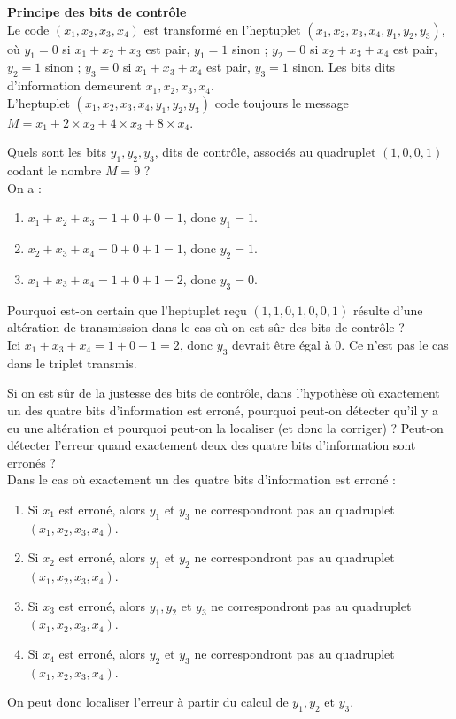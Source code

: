 \documentclass[a4paper,10pt,exos]{nsi}
\begin{document}
    \question \textbf{\textcolor{UGLiBlue}{Principe des bits de contrôle}}\\
    \textcolor{UGLiBlue}{Le code $(x_1, x_2, x_3, x_4)$ est transformé en l’heptuplet $(x_1, x_2, x_3, x_4, y_1, y_2, y_3)$, où $y_1 = 0$ si $x_1 + x_2 + x_3$ est pair, $y_1 = 1$ sinon ; $y_2 = 0$ si $x_2 + x_3 + x_4$ est pair, $y_2 = 1$ sinon ; $y_3 = 0$ si $x_1 + x_3 + x_4$ est pair, $y_3 = 1$ sinon. Les bits dits d’information demeurent $x_1, x_2, x_3, x_4$.\\
    L’heptuplet $(x_1, x_2, x_3, x_4, y_1, y_2, y_3)$ code toujours le message $M = x_1 + 2 \times x_2 + 4 \times x_3 + 8 \times x_4$.}

    \begin{enumalph}
        \item \textcolor{UGLiBlue}{Quels sont les bits $y_1, y_2, y_3$, dits de contrôle, associés au quadruplet $(1,0,0,1)$ codant le nombre $M = 9$ ?}\\
        On a : 
        \begin{enumerate}[label=\textbullet]
            \item $x_1+x_2+x_3=1+0+0=1$, donc $y_1=1$.
            \item $x_2+x_3+x_4=0+0+1=1$, donc $y_2=1$.
            \item $x_1+x_3+x_4=1+0+1=2$, donc $y_3=0$.
        \end{enumerate}
        \item \textcolor{UGLiBlue}{Pourquoi est-on certain que l’heptuplet reçu $(1,1,0,1,0,0,1)$ résulte d’une altération de transmission dans le cas où on est sûr des bits de contrôle ?}\\
        Ici $x_1+x_3+x_4=1+0+1=2$, donc $y_3$ devrait être égal à $0$. Ce n'est pas le cas dans le triplet transmis.
        \item \textcolor{UGLiBlue}{Si on est sûr de la justesse des bits de contrôle, dans l’hypothèse où exactement un des quatre bits d’information est erroné, pourquoi peut-on détecter qu’il y a eu une altération et pourquoi peut-on la localiser (et donc la corriger) ? Peut-on détecter l’erreur quand exactement deux des quatre bits d’information sont erronés ?}\\
        Dans le cas où exactement un des quatre bits d'information est erroné :
        \begin{enumerate}[label=\textbullet]
            \item Si $x_1$ est erroné, alors $y_1$ et $y_3$ ne correspondront pas au quadruplet $(x_1,x_2,x_3,x_4)$.
            \item Si $x_2$ est erroné, alors $y_1$ et $y_2$ ne correspondront pas au quadruplet $(x_1,x_2,x_3,x_4)$.
            \item Si $x_3$ est erroné, alors $y_1,y_2$ et $y_3$ ne correspondront pas au quadruplet $(x_1,x_2,x_3,x_4)$.
            \item Si $x_4$ est erroné, alors $y_2$ et $y_3$ ne correspondront pas au quadruplet $(x_1,x_2,x_3,x_4)$.
        \end{enumerate}
        On peut donc localiser l'erreur à partir du calcul de $y_1, y_2$ et $y_3$.\\
        

\end{enumalph}
\end{document}
